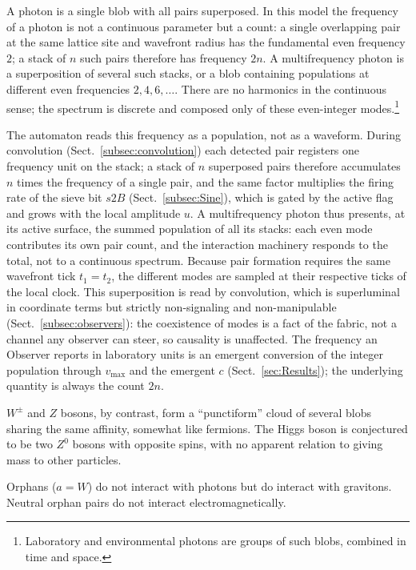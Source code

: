 \documentclass{ijuc}
\begin{document}
A photon is a single blob with all pairs superposed. In this model the frequency of a photon is not a continuous parameter but a count: a single overlapping pair at the same lattice site and wavefront radius has the fundamental even frequency $2$; a stack of $n$ such pairs therefore has frequency $2n$. A multifrequency photon is a superposition of several such stacks, or a blob containing populations at different even frequencies $2,4,6,\dots$. There are no harmonics in the continuous sense; the spectrum is discrete and composed only of these even-integer modes.\footnote{Laboratory and environmental photons are groups of such blobs, combined in time and space.}

The automaton reads this frequency as a population, not as a waveform. During convolution (Sect.~\ref{subsec:convolution}) each detected pair registers one frequency unit on the stack; a stack of $n$ superposed pairs therefore accumulates $n$ times the frequency of a single pair, and the same factor multiplies the firing rate of the sieve bit $s2B$ (Sect.~\ref{subsec:Sine}), which is gated by the active flag and grows with the local amplitude $u$. A multifrequency photon thus presents, at its active surface, the summed population of all its stacks: each even mode contributes its own pair count, and the interaction machinery responds to the total, not to a continuous spectrum. Because pair formation requires the same wavefront tick $t_1=t_2$, the different modes are sampled at their respective ticks of the local clock. This superposition is read by convolution, which is superluminal in coordinate terms but strictly non-signaling and non-manipulable (Sect.~\ref{subsec:observers}): the coexistence of modes is a fact of the fabric, not a channel any observer can steer, so causality is unaffected. The frequency an Observer reports in laboratory units is an emergent conversion of the integer population through $v_{\max}$ and the emergent $c$ (Sect.~\ref{sec:Results}); the underlying quantity is always the count $2n$.

$W^{\pm}$ and $Z$ bosons, by contrast, form a ``punctiform'' cloud of several blobs sharing the same affinity, somewhat like fermions. The Higgs boson is conjectured to be two $Z^0$ bosons with opposite spins, with no apparent relation to giving mass to other particles.

Orphans ($a=W$) do not interact with photons but do interact with gravitons. Neutral orphan pairs do not interact electromagnetically.

\end{document}
